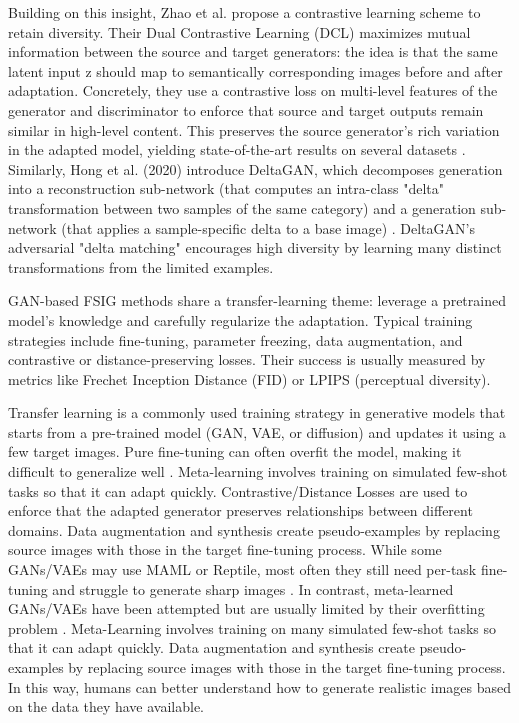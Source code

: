 Building on this insight, Zhao et al. propose a contrastive learning scheme to retain diversity. 
Their Dual Contrastive Learning (DCL) maximizes mutual information between the source and target generators: 
the idea is that the same latent input z should map to semantically corresponding images before and after adaptation.
Concretely, they use a contrastive loss on multi-level features of the generator and discriminator to enforce that 
source and target outputs remain similar in high-level content. This preserves the source generator's 
rich variation in the adapted model, yielding state-of-the-art results on several datasets \cite{zhao2023closerlookfewshotimage}.
Similarly, Hong et al. (2020) introduce DeltaGAN, which decomposes generation into a reconstruction sub-network 
(that computes an intra-class "delta" transformation between two samples of the same category) and a generation sub-network 
(that applies a sample-specific delta to a base image) \cite{hong2022deltagandiversefewshotimage}.
DeltaGAN's adversarial "delta matching" encourages high diversity by learning many distinct transformations from the limited examples.

GAN-based FSIG methods share a transfer-learning theme: 
leverage a pretrained model's knowledge and carefully regularize the adaptation. 
Typical training strategies include fine-tuning, parameter freezing, data augmentation, and contrastive or distance-preserving losses. 
Their success is usually measured by metrics like Frechet Inception Distance (FID) or LPIPS (perceptual diversity).

Transfer learning is a commonly used training strategy in generative models that starts from a pre-trained model (GAN, VAE, or diffusion) and updates it using a few target images. Pure fine-tuning can often overfit the model, making it difficult to generalize well \cite{zhao2023closerlookfewshotimage}. Meta-learning involves training on simulated few-shot tasks so that it can adapt quickly. Contrastive/Distance Losses are used to enforce that the adapted generator preserves relationships between different domains. Data augmentation and synthesis create pseudo-examples by replacing source images with those in the target fine-tuning process. While some GANs/VAEs may use MAML or Reptile, most often they still need per-task fine-tuning and struggle to generate sharp images \cite{hong2022deltagandiversefewshotimage}. In contrast, meta-learned GANs/VAEs have been attempted but are usually limited by their overfitting problem \cite{hong2022deltagandiversefewshotimage}. Meta-Learning involves training on many simulated few-shot tasks so that it can adapt quickly. Data augmentation and synthesis create pseudo-examples by replacing source images with those in the target fine-tuning process. In this way, humans can better understand how to generate realistic images based on the data they have available.

